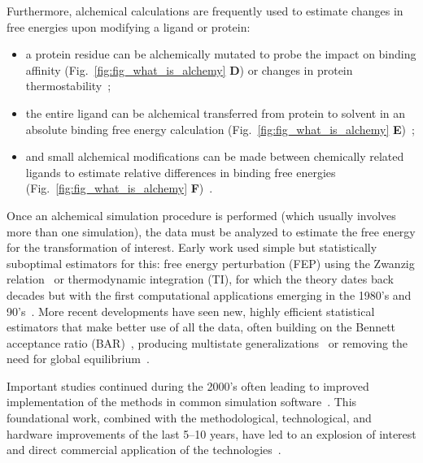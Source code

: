 \documentclass[9pt,bestpractices]{livecoms}
\begin{document}
Furthermore, alchemical calculations are frequently used to estimate changes in free energies upon modifying a ligand or protein: 
\begin{itemize}
\item a protein residue can be alchemically mutated to probe the impact on binding affinity (Fig.~\ref{fig:fig_what_is_alchemy} \textbf{D})\cite{hauser2018predicting,aldeghi2018accurate} or changes in protein thermostability~\cite{seeliger2010protein,gapsys2016insights,gapsys2016accurate,aldeghi2019accurate}; 
\item the entire ligand can be alchemical transferred from protein to solvent in an absolute binding free energy calculation (Fig.~\ref{fig:fig_what_is_alchemy} \textbf{E})~\cite{mobley2007predicting,aldeghi2015accurate,aldeghi2017predictions}; 
\item and small alchemical modifications can be made between chemically related ligands to estimate relative differences in binding free energies (Fig.~\ref{fig:fig_what_is_alchemy} \textbf{F})~\cite{wang2015accurate,mey2016blinded,gapsys2020large}.
\end{itemize}
%

Once an alchemical simulation procedure is performed (which usually involves more than one simulation), the data must be analyzed to estimate the free energy for the transformation of interest.
Early work used simple but statistically suboptimal estimators for this: free energy perturbation (FEP) using the Zwanzig relation~\cite{zwanzig1954hightemperature} or thermodynamic integration (TI), for which the theory dates back decades but with the first computational applications emerging in the 1980's and 90's~\cite{kirkwood1935statistical, jorgensen1985monte, kollman1993free, wong1986dynamicsa, merz1989free}. %
More recent developments have seen new, highly efficient statistical estimators that make better use of all the data, often building on the Bennett acceptance ratio (BAR)~\cite{bennett1976efficient}, producing multistate generalizations~\cite{shirts2008statisticallya} or removing the need for global equilibrium~\cite{wu2016multiensemble, mey2014xtram, wu2014statistically}.

Important studies continued during the 2000's often leading to improved implementation of the methods in common simulation software~\cite{shirts2003extremely,shirts2005solvation,vanderspoel2005gromacs, mermelstein2018fast, wang2015accurate, hedges2019biosimspace}. 
This foundational work, combined with the methodological, technological, and hardware improvements of the last 5--10 years, have led to an explosion of interest and direct commercial application of the technologies~\cite{wang2015accurate, fratev2019improved, schindler2020largescale, cournia2017relative, sherborne2016collaborating}.
%
\end{document}
